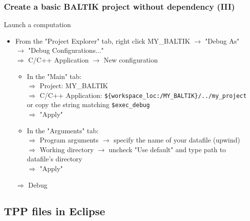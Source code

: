 \documentclass[10pt, hyperref={unicode=true,pdfusetitle, bookmarks=true,bookmarksnumbered=false,bookmarksopen=false, breaklinks=false,pdfborder={0 0 1},backref=true,colorlinks=true,linkcolor=darkblue,pageanchor, urlcolor=darkblue}]{beamer}
\begin{document}
\begin{frame}
\frametitle{Create a basic BALTIK project without dependency (III)}

\begin{exampleblock}{Launch a computation}
\begin{itemize}
\item From the "Project Explorer" tab, right click MY\_BALTIK $\rightarrow$ "Debug As" $\rightarrow$ "Debug Configurations..." \\
  $\Rightarrow$ C/C++ Application $\rightarrow$ New configuration
  \begin{itemize}
  \item In the "Main" tab:\\
  $\Rightarrow$ Project: MY\_BALTIK \\
  $\Rightarrow$ C/C++ Application: \texttt{\$\{workspace\_loc:/MY\_BALTIK\}/../my\_project} or copy the string matching \texttt{\$exec\_debug} \\
  $\Rightarrow$ "Apply" 
  \item In the "Arguments" tab:\\
  $\Rightarrow$ Program arguments $\rightarrow$ specify the name of your datafile (upwind) \\
  $\Rightarrow$ Working directory $\rightarrow$ uncheck "Use default" and type path to datafile's directory \\
  $\Rightarrow$ "Apply"
  \end{itemize}
  $\Rightarrow$ Debug
\end{itemize}
\end{exampleblock}

\end{frame}

\subsection{\bf{TPP files in Eclipse}}
\end{document}
